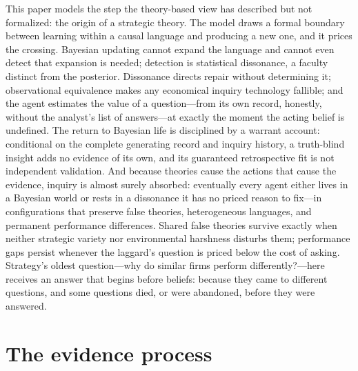 \documentclass[11pt]{article}
\theoremstyle{definition}
\begin{document}
This paper models the step the theory-based view has described but not formalized: the origin of a strategic theory.
The model draws a formal boundary between learning within a causal language and producing a new one, and it prices the crossing.
Bayesian updating cannot expand the language and cannot even detect that expansion is needed; detection is statistical dissonance, a faculty distinct from the posterior.
Dissonance directs repair without determining it; observational equivalence makes any economical inquiry technology fallible; and the agent estimates the value of a question---from its own record, honestly, without the analyst's list of answers---at exactly the moment the acting belief is undefined.
The return to Bayesian life is disciplined by a warrant account: conditional on the complete generating record and inquiry history, a truth-blind insight adds no evidence of its own, and its guaranteed retrospective fit is not independent validation.
And because theories cause the actions that cause the evidence, inquiry is almost surely absorbed: eventually every agent either lives in a Bayesian world or rests in a dissonance it has no priced reason to fix---in configurations that preserve false theories, heterogeneous languages, and permanent performance differences.
Shared false theories survive exactly when neither strategic variety nor environmental harshness disturbs them; performance gaps persist whenever the laggard's question is priced below the cost of asking.
Strategy's oldest question---why do similar firms perform differently?---here receives an answer that begins before beliefs: because they came to different questions, and some questions died, or were abandoned, before they were answered.




\appendix
\section{The evidence process}
\label{app:eprocess}
\end{document}
